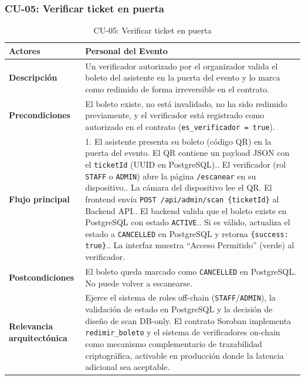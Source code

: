 \documentclass[12pt,oneside]{article}
\begin{document}
\clearpage
\subsubsection{CU-05: Verificar ticket en puerta}

\begin{table}[h!]
  \centering
  \begin{tabularx}{\textwidth}{@{}p{3.5cm} X@{}}
    \toprule
    \textbf{Actores} & Personal del Evento\\
    \midrule
    \textbf{Descripción} & Un verificador autorizado por el organizador valida el boleto del asistente en la puerta del evento y lo marca como redimido de forma irreversible en el contrato.\\
    \midrule
    \textbf{Precondiciones} & El boleto existe, no está invalidado, no ha sido redimido previamente, y el verificador está registrado como autorizado en el contrato (\texttt{es\_verificador = true}).\\
    \midrule
    \textbf{Flujo principal} &
      1. El asistente presenta su boleto (código QR) en la puerta del evento. El QR contiene un payload JSON con el \texttt{ticketId} (UUID en PostgreSQL).\newline
      2. El verificador (rol \texttt{STAFF} o \texttt{ADMIN}) abre la página \texttt{/escanear} en su dispositivo.\newline
      3. La cámara del dispositivo lee el QR. El frontend envía \texttt{POST /api/admin/scan \{ticketId\}} al Backend API.\newline
      4. El backend valida que el boleto existe en PostgreSQL con estado \texttt{ACTIVE}.\newline
      5. Si es válido, actualiza el estado a \texttt{CANCELLED} en PostgreSQL y retorna \texttt{\{success: true\}}.\newline
      6. La interfaz muestra ``Acceso Permitido'' (verde) al verificador.\\
    \midrule
    \textbf{Postcondiciones} & El boleto queda marcado como \texttt{CANCELLED} en PostgreSQL. No puede volver a escanearse.\\
    \midrule
    \textbf{Relevancia arquitectónica} & Ejerce el sistema de roles off-chain (\texttt{STAFF}/\texttt{ADMIN}), la validación de estado en PostgreSQL y la decisión de diseño de scan DB-only. El contrato Soroban implementa \texttt{redimir\_boleto} y el sistema de verificadores on-chain como mecanismo complementario de trazabilidad criptográfica, activable en producción donde la latencia adicional sea aceptable.\\
    \bottomrule
  \end{tabularx}
  \caption{CU-05: Verificar ticket en puerta}
  \label{tab:cu05}
\end{table}
\end{document}
